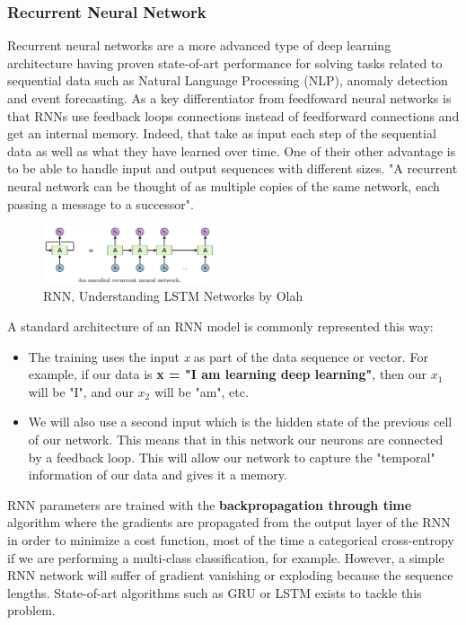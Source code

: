 \documentclass[letter,8pt]{article}\usepackage[]{graphicx}\usepackage[]{color}
\begin{document}
\subsubsection{Recurrent Neural Network}
Recurrent neural networks are a more advanced type of deep learning architecture having proven state-of-art performance for solving tasks related to sequential data such as Natural Language Processing (NLP), anomaly detection and event forecasting. As a key differentiator from feedfoward neural networks is that RNNs use feedback loops connections instead of feedforward connections and get an internal memory. Indeed, that take as input each step of the sequential data as well as what they have learned over time. One of their other advantage is to be able to handle input and output sequences with different sizes. "A recurrent neural network can be thought of as multiple copies of the same network, each passing a message to a successor"\cite{olah_2015}.
\begin{figure}
    \begin{center}
    \includegraphics[width=0.45\textwidth]{figure/RNN_process.png}
    \end{center}
     \caption{RNN, Understanding LSTM Networks by Olah}
     \label{fig:rnn_process}
\end{figure}

A standard architecture of an RNN model is commonly
represented this way:
\begin{itemize}
\item The training uses the input \textit{x} as part of the data sequence or vector. For example, if our data is \textbf{x = "I am learning deep learning"}, then our $x_1$ will be "I", and our $x_2$ will be "am", etc.
\item We will also use a second input which is the hidden state of the previous cell of our network. This means that in this network our neurons are connected by a feedback loop. This will allow our network to capture the "temporal" information of our data and gives it a memory. 
\end{itemize}

RNN parameters are trained with the \textbf{backpropagation through time} algorithm where the gradients are propagated from the output layer of the RNN in order to minimize a cost function, most of the time a categorical cross-entropy if we are performing a multi-class classification, for example. However, a simple RNN network will suffer of gradient vanishing or exploding because the sequence lengths. State-of-art algorithms such as GRU or LSTM exists to tackle this problem.  
\end{document}
